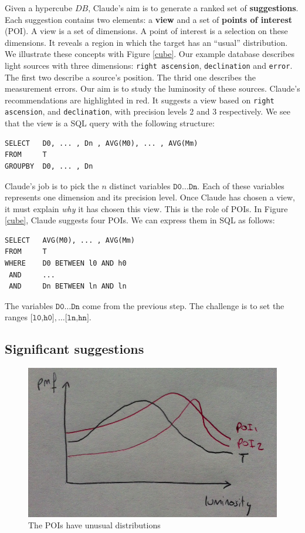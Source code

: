 Given a hypercube $DB$, Claude's aim is to generate a ranked set of
\textbf{suggestions}.  Each suggestion contains two elements: a \textbf{view}
and a set of \textbf{points of interest} (POI). A view is a set of dimensions.
A point of interest is a selection on these dimensions. It reveals a region
in which the target has an ``usual'' distribution.  We illustrate these
concepts with Figure \ref{cube}. Our example database describes light sources
with three dimensions: \texttt{right ascension}, \texttt{declination} and
\texttt{error}.  The first two describe a source's position. The thrid one
describes the measurement errors. Our aim is to study the luminosity of these
sources. Claude's recommendations are highlighted in red. It suggests a view
based on \texttt{right ascension}, and \texttt{declination}, with precision
levels 2 and 3 respectively. We see that the view is a SQL query with the
following structure:
\begin{verbatim}
SELECT   D0, ... , Dn , AVG(M0), ... , AVG(Mm)
FROM     T
GROUPBY  D0, ... , Dn
\end{verbatim}
Claude's job is to pick the $n$ distinct variables $\texttt{D0} \ldots
\texttt{Dn}$. Each of these variables represents one dimension and its
precision level.  Once Claude has chosen a view, it must explain \emph{why} it
has chosen this view.  This is the role of POIs. In Figure \ref{cube}, Claude suggests
four POIs. We can express them in SQL as follows:
\begin{verbatim}
SELECT   AVG(M0), ... , AVG(Mm)
FROM     T
WHERE    D0 BETWEEN l0 AND h0
 AND     ...
 AND     Dn BETWEEN ln AND ln
\end{verbatim}
The variables $\texttt{D0} \ldots \texttt{Dn}$ come from the previous step. The
challenge is to set the ranges $\texttt{[l0,h0]}, \dots \texttt{[ln,hn]}$.


\subsection{Significant suggestions}
\begin{figure}[t!]
\centering
\includegraphics[width=\columnwidth]{images/poi}
\caption{The POIs have unusual distributions}
\label{poi}
\end{figure}

